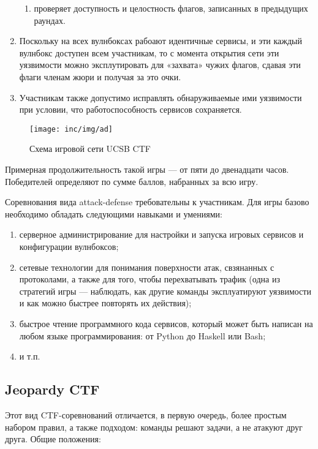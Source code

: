 \begin{enumerate}
\begin{enumerate}
      \item проверяет доступность и целостность флагов, записанных в предыдущих раундах.
    \end{enumerate}
  \item Поскольку на всех вулнбоксах рабоают идентичные сервисы, и эти каждый вулнбокс доступен всем участникам, то с момента открытия сети эти уязвимости можно эксплутировать для «захвата» чужих флагов, сдавая эти флаги членам жюри и получая за это очки.
  \item Участникам также допустимо исправлять обнаруживаемые ими уязвимости при условии, что работоспособность сервисов сохраняется.
\end{enumerate}

\begin{figure}
  \centering
  \texttt{[image: inc/img/ad]}
  \caption{Схема игровой сети UCSB CTF}
  \label{fig:ad}
\end{figure}

Примерная продолжительность такой игры --- от пяти до двенадцати часов. Победителей определяют по сумме баллов, набранных за всю игру.

Соревнования вида attack-defense требовательны к участникам. Для игры базово необходимо обладать следующими навыками и умениями:
\begin{enumerate}
  \item серверное администрирование для настройки и запуска игровых сервисов и конфигурации вулнбоксов;
  \item сетевые технологии для понимания поверхности атак, свзянанных с протоколами, а также для того, чтобы перехватывать трафик (одна из стратегий игры --- наблюдать, как другие команды эксплуатируют уязвимости и как можно быстрее повторять их действия\cite{ReplayAttacks});
  \item быстрое чтение программного кода сервисов, который может быть написан на любом языке программирования: от Python\cite{PythonService} до Haskell\cite{HaskellSerivce} или Bash\cite{BashService};
  \item и т.п.
\end{enumerate}




\subsection{Jeopardy CTF}

Этот вид CTF-соревнований отличается, в первую очередь, более простым набором правил, а также подходом: команды решают задачи, а не атакуют друг друга. Общие положения:

